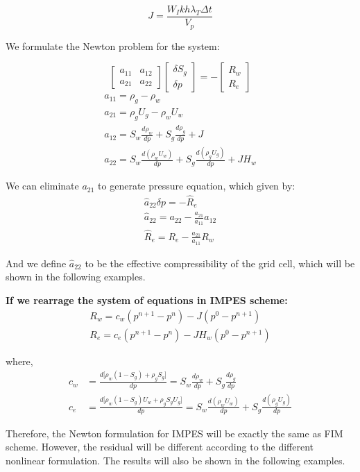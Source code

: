 \documentclass[11pt]{article}
\begin{document}
    \begin{equation}
        J = \frac{W_Ikh\lambda_T\Delta t}{V_p}
    \end{equation}
    
    We formulate the Newton problem for the system:
    
    \begin{equation}
        \begin{bmatrix}
          a_{11} & a_{12} \\ 
          a_{21} & a_{22}
        \end{bmatrix}
        \begin{bmatrix}
          \delta S_g \\
          \delta p
        \end{bmatrix} = -
        \begin{bmatrix}
          R_w \\
          R_e
        \end{bmatrix}
    \end{equation}
    \begin{gather}
        a_{11} = \rho_g-\rho_w \\
        a_{21} = \rho_gU_g-\rho_wU_w \\
        a_{12} = S_w\frac{d\rho_w}{dp} + S_g\frac{d\rho_g}{dp} + J \\
        a_{22} = S_w\frac{d(\rho_wU_w)}{dp} + S_g\frac{d(\rho_gU_g)}{dp} + JH_w
    \end{gather}
    
    We can eliminate $a_{21}$ to generate pressure equation, which given by:
    \begin{gather}
        \hat{a}_{22}\delta p = -\hat{R}_e \\
        \hat{a}_{22} = a_{22} - \frac{a_{21}}{a_{11}}a_{12} \\
        \hat{R}_e = R_e - \frac{a_{21}}{a_{11}}R_w
    \end{gather}
    
    And we define $\hat{a}_{22}$ to be the effective compressibility of the grid
    cell, which will be shown in the following examples.
    
    \vspace{10pt}
    \noindent\textbf{If we rearrage the system of equations in IMPES scheme:}
    \begin{gather}
        R_w=c_w(p^{n+1}-p^n) - J(p^0-p^{n+1}) \\
        R_e=c_e(p^{n+1}-p^n) - JH_w(p^0-p^{n+1})
    \end{gather}
    
    where,
    \[\begin{split}
    c_w &= \frac{d\big[\rho_w(1-S_g) + \rho_gS_g\big]}{dp}
          = S_w\frac{d\rho_w}{dp} + S_g\frac{d\rho_g}{dp} \\
    c_e &= \frac{d\big[\rho_w(1-S_g)U_w + \rho_gS_gU_g\big]}{dp}
          = S_w\frac{d(\rho_wU_w)}{dp} + S_g\frac{d(\rho_gU_g)}{dp}
    \end{split}\]

    Therefore, the Newton formulation for IMPES will be exactly the same as
    FIM scheme. However, the residual will be different according to the different
    nonlinear formulation. The results will also be shown in the following examples.
\end{document}
